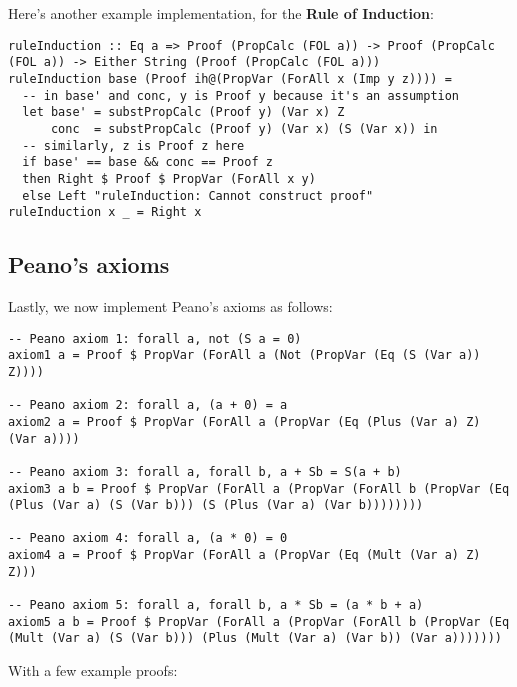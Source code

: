 \documentclass{article}
\begin{document}
Here's another example implementation, for the \textbf{Rule of Induction}:

\begin{lstlisting}
ruleInduction :: Eq a => Proof (PropCalc (FOL a)) -> Proof (PropCalc (FOL a)) -> Either String (Proof (PropCalc (FOL a)))
ruleInduction base (Proof ih@(PropVar (ForAll x (Imp y z)))) =
  -- in base' and conc, y is Proof y because it's an assumption
  let base' = substPropCalc (Proof y) (Var x) Z
      conc  = substPropCalc (Proof y) (Var x) (S (Var x)) in
  -- similarly, z is Proof z here
  if base' == base && conc == Proof z
  then Right $ Proof $ PropVar (ForAll x y)
  else Left "ruleInduction: Cannot construct proof"
ruleInduction x _ = Right x
\end{lstlisting}

\subsection{Peano's axioms}

Lastly, we now implement Peano's axioms as follows:

\begin{lstlisting}
-- Peano axiom 1: forall a, not (S a = 0)
axiom1 a = Proof $ PropVar (ForAll a (Not (PropVar (Eq (S (Var a)) Z))))

-- Peano axiom 2: forall a, (a + 0) = a
axiom2 a = Proof $ PropVar (ForAll a (PropVar (Eq (Plus (Var a) Z) (Var a))))

-- Peano axiom 3: forall a, forall b, a + Sb = S(a + b)
axiom3 a b = Proof $ PropVar (ForAll a (PropVar (ForAll b (PropVar (Eq (Plus (Var a) (S (Var b))) (S (Plus (Var a) (Var b))))))))

-- Peano axiom 4: forall a, (a * 0) = 0
axiom4 a = Proof $ PropVar (ForAll a (PropVar (Eq (Mult (Var a) Z) Z)))

-- Peano axiom 5: forall a, forall b, a * Sb = (a * b + a)
axiom5 a b = Proof $ PropVar (ForAll a (PropVar (ForAll b (PropVar (Eq (Mult (Var a) (S (Var b))) (Plus (Mult (Var a) (Var b)) (Var a)))))))
\end{lstlisting}

With a few example proofs:
\end{document}
